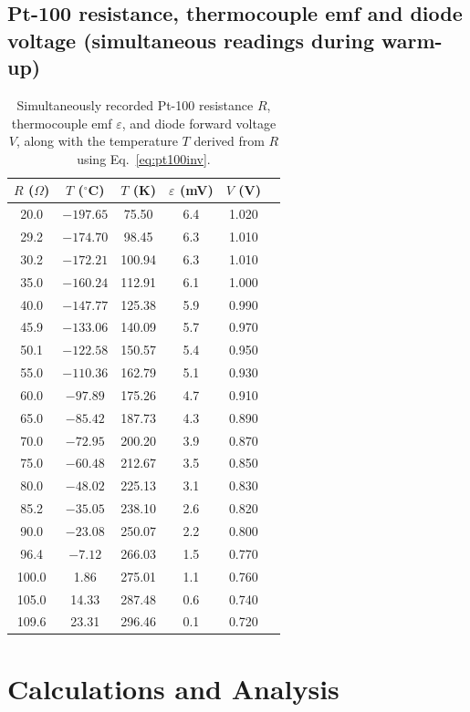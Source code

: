 \documentclass[11pt,a4paper]{article}
\begin{document}
\subsection{Pt-100 resistance, thermocouple emf and diode voltage (simultaneous readings during warm-up)}
\begin{table}[H]
\centering
\caption{Simultaneously recorded Pt-100 resistance $R$, thermocouple emf $\varepsilon$, and diode forward voltage $V$, along with the temperature $T$ derived from $R$ using Eq.~\eqref{eq:pt100inv}.}
\begin{tabular}{cccccc}
\toprule
$R$ ($\Omega$) & $T$ ($^\circ$C) & $T$ (K) & $\varepsilon$ (mV) & $V$ (V) \\
\midrule
20.0 & $-197.65$ & 75.50 & 6.4 & 1.020 \\
29.2 & $-174.70$ & 98.45 & 6.3 & 1.010 \\
30.2 & $-172.21$ & 100.94 & 6.3 & 1.010 \\
35.0 & $-160.24$ & 112.91 & 6.1 & 1.000 \\
40.0 & $-147.77$ & 125.38 & 5.9 & 0.990 \\
45.9 & $-133.06$ & 140.09 & 5.7 & 0.970 \\
50.1 & $-122.58$ & 150.57 & 5.4 & 0.950 \\
55.0 & $-110.36$ & 162.79 & 5.1 & 0.930 \\
60.0 & $-97.89$ & 175.26 & 4.7 & 0.910 \\
65.0 & $-85.42$ & 187.73 & 4.3 & 0.890 \\
70.0 & $-72.95$ & 200.20 & 3.9 & 0.870 \\
75.0 & $-60.48$ & 212.67 & 3.5 & 0.850 \\
80.0 & $-48.02$ & 225.13 & 3.1 & 0.830 \\
85.2 & $-35.05$ & 238.10 & 2.6 & 0.820 \\
90.0 & $-23.08$ & 250.07 & 2.2 & 0.800 \\
96.4 & $-7.12$ & 266.03 & 1.5 & 0.770 \\
100.0 & 1.86 & 275.01 & 1.1 & 0.760 \\
105.0 & 14.33 & 287.48 & 0.6 & 0.740 \\
109.6 & 23.31 & 296.46 & 0.1 & 0.720 \\
\bottomrule
\end{tabular}
\end{table}

\section{Calculations and Analysis}
\end{document}
